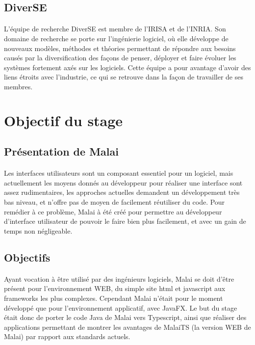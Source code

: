\documentclass[11pt, a4paper, pdftex]{article}
\begin{document}
    \subsection{DiverSE}\label{subsec:diverse}
             \paragraph{}
                L'équipe de recherche DiverSE est membre de l'IRISA et de l'INRIA. Son domaine de recherche se porte sur l'ingénierie logiciel, où elle développe de nouveaux modèles,
                méthodes et théories permettant de répondre aux besoins causés par la diversification des façons de penser, déployer et faire évoluer les systèmes fortement axés sur les logiciels.
                Cette équipe a pour avantage d'avoir des liens étroits avec l'industrie, ce qui se retrouve dans la façon de travailler de ses membres.
    \newpage
    \section{Objectif du stage}\label{sec:objsta}
    \vspace{1cm}
        \subsection{Présentation de Malai}\label{subsec:premal}
            \paragraph{}
                Les interfaces utilisateurs sont un composant essentiel pour un logiciel, mais actuellement les moyens donnés au développeur pour réaliser
                une interface sont assez rudimentaires, les approches actuelles demandent un développement très bas niveau, et n'offre pas de moyen de facilement réutiliser du code.
                Pour remédier à ce problème, Malai à été créé pour permettre au développeur d'interface utilisateur de pouvoir le faire bien plus facilement, et avec un gain de temps non négligeable.
    \vspace{1cm}
        \subsection{Objectifs}\label{subsec:objsta}
            \paragraph{}
                Ayant vocation à être utilisé par des ingénieurs logiciels, Malai se doit d'être présent pour l'environnement WEB, du simple site html et javascript aux frameworks les plus complexes.
                Cependant Malai n'était pour le moment développé que pour l'environnement applicatif, avec JavaFX. Le but du stage était donc de porter le code Java de Malai
                vers Typescript, ainsi que réaliser des applications permettant de montrer les avantages de MalaiTS (la version WEB de Malai) par rapport aux standards actuels.
\end{document}
